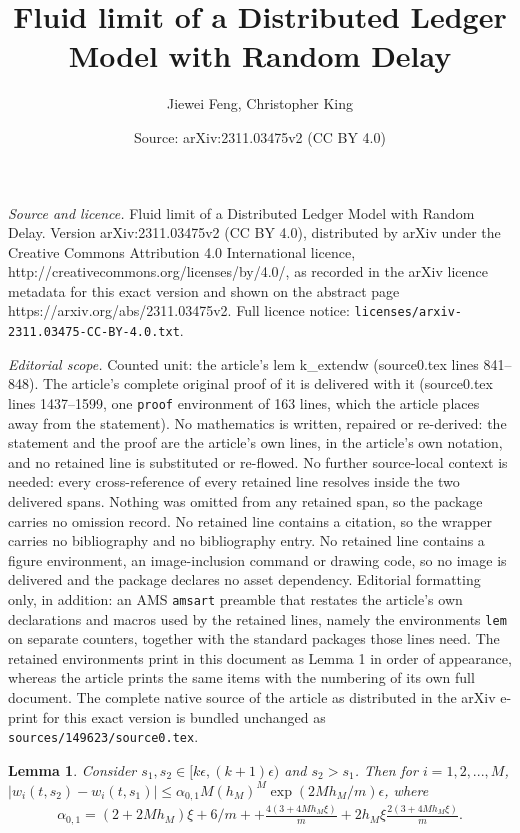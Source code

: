 \documentclass[10pt,a4paper]{amsart}
\title{Fluid limit of a Distributed Ledger Model with Random Delay}
\author{Jiewei Feng, Christopher King}
\date{Source: arXiv:2311.03475v2 (CC BY 4.0)}
\newtheorem{lem}{Lemma}
\begin{document}
\maketitle

\noindent\emph{Source and licence.} Fluid limit of a Distributed Ledger Model with Random Delay. Version arXiv:2311.03475v2 (CC BY 4.0), distributed by arXiv under the Creative Commons Attribution 4.0 International licence, http://creativecommons.org/licenses/by/4.0/, as recorded in the arXiv licence metadata for this exact version and shown on the abstract page https://arxiv.org/abs/2311.03475v2. Full licence notice: \texttt{licenses/arxiv-2311.03475-CC-BY-4.0.txt}.\par\smallskip

\noindent\textit{Editorial scope.} Counted unit: the article's lem k\_extendw (source0.tex lines 841--848). The article's complete original proof of it is delivered with it (source0.tex lines 1437--1599, one \texttt{proof} environment of 163 lines, which the article places away from the statement). No mathematics is written, repaired or re-derived: the statement and the proof are the article's own lines, in the article's own notation, and no retained line is substituted or re-flowed.  No further source-local context is needed: every cross-reference of every retained line resolves inside the two delivered spans.  Nothing was omitted from any retained span, so the package carries no omission record.  No retained line contains a citation, so the wrapper carries no bibliography and no bibliography entry.  No retained line contains a figure environment, an image-inclusion command or drawing code, so no image is delivered and the package declares no asset dependency.  Editorial formatting only, in addition: an AMS \texttt{amsart} preamble that restates the article's own declarations and macros used by the retained lines, namely the environments \texttt{lem} on separate counters, together with the standard packages those lines need.  The retained environments print in this document as Lemma 1 in order of appearance, whereas the article prints the same items with the numbering of its own full document.  The complete native source of the article as distributed in the arXiv e-print for this exact version is bundled unchanged as \texttt{sources/149623/source0.tex}.
\begin{lem}\label{k_extendw}%
Consider $s_1,s_2\in[k\epsilon,(k+1)\epsilon)$ and $s_2>s_1$. Then for $i=1,2,...,M$, $\left|w_i(t,s_2)-w_i(t,s_1)\right|\leq \alpha_{0,1}M(h_M)^M\exp(2Mh_M/m)\epsilon$, where 
\begin{align*} 
\alpha_{0,1}=(2+2Mh_M)\xi+6/m+
+\frac{4(3+4M h_M \xi)}{m}
+2h_M\xi \frac{2(3+4 M h_M \xi)}{m}.
\end{align*} 
\end{lem}
\end{document}
